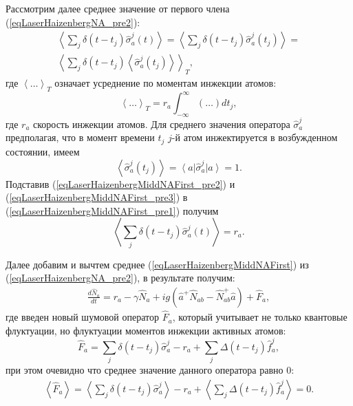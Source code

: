Рассмотрим далее среднее значение от первого члена (\ref{eqLaserHaizenbergNA_pre2}):
\begin{eqnarray}
\left<\sum_j \delta\left(t -
t_j\right)\hat{\sigma}^{j}_{a}\left(t\right)\right> = 
\left<\sum_j \delta\left(t -
t_j\right)\hat{\sigma}^{j}_{a}\left(t_j\right)\right> =
\nonumber \\
\left<\sum_j \delta\left(t -
t_j\right)\left<\hat{\sigma}^{j}_{a}\left(t_j\right)\right>\right>_T,
\label{eqLaserHaizenbergMiddNAFirst_pre1}
\end{eqnarray}
где $\left<\dots\right>_T$ означает усреднение по моментам инжекции
атомов:
\begin{equation}
\left<\dots\right>_T =
r_a\int_{-\infty}^{\infty}\left(\dots\right)d t_j,
\label{eqLaserHaizenbergMiddNAFirst_pre2}
\end{equation}
где $r_a$ скорость инжекции атомов. 
Для среднего значения оператора $\hat{\sigma}^{j}_{a}$
предполагая, что в момент времени $t_j$ $j$-й атом инжектируется в
возбужденном состоянии, имеем
\begin{equation}
\left<\hat{\sigma}^{j}_{a}\left(t_j\right)\right> = 
\left<a\right|\hat{\sigma}^{j}_{a}\left|a\right> = 1.
\label{eqLaserHaizenbergMiddNAFirst_pre3}
\end{equation}  
Подставив (\ref{eqLaserHaizenbergMiddNAFirst_pre2}) и
(\ref{eqLaserHaizenbergMiddNAFirst_pre3}) в
(\ref{eqLaserHaizenbergMiddNAFirst_pre1}) получим
\begin{equation}
\left<\sum_j \delta\left(t -
t_j\right)\hat{\sigma}^{j}_{a}\left(t\right)\right> = r_a.
\label{eqLaserHaizenbergMiddNAFirst}
\end{equation}

Далее добавим и вычтем среднее (\ref{eqLaserHaizenbergMiddNAFirst})
из (\ref{eqLaserHaizenbergNA_pre2}), в результате получим:
\begin{eqnarray}
\frac{d \hat{N}_{a}}{d t} 
= r_a  - \gamma
\hat{N}_{a} 
+ i g  \left(
\hat{a}^{+}\hat{N}_{ab} -
\hat{N}_{ab}^{+}\hat{a}
\right) + \hat{F}_{a},
\label{eqLaserHaizenbergNA}
\end{eqnarray}
где введен новый шумовой оператор $\hat{F}_{a}$, который учитывает не только
квантовые флуктуации, но флуктуации моментов инжекции активных атомов:
\begin{equation}
\hat{F}_{a} = \sum_j \delta\left(t - t_j\right)\hat{\sigma}^{j}_{a} -
r_a + \sum_j \Delta\left(t - t_j\right) \hat{f}_{a}^{j}, 
\label{eqLaserHaizenbergFNA}
\end{equation}
при этом очевидно что среднее значение данного оператора равно 0:
\begin{eqnarray}
\left<\hat{F}_{a}\right> = \left<\sum_j \delta\left(t - t_j\right)\hat{\sigma}^{j}_{a}\right> -
r_a + \left<\sum_j \Delta\left(t - t_j\right)
\hat{f}_{a}^{j}\right> = 0. 
\nonumber
\end{eqnarray}

